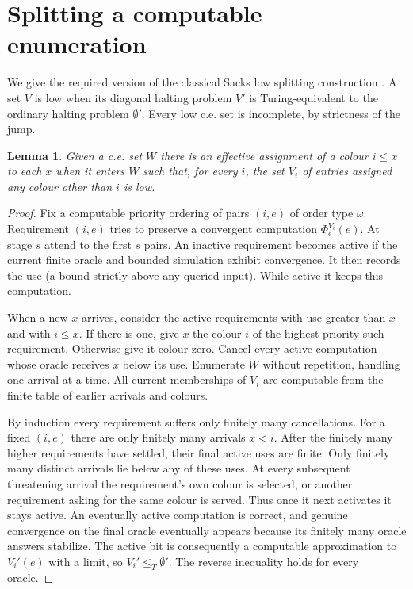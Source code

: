 \documentclass[11pt]{article}
\newtheorem{lemma}[theorem]{Lemma}
\begin{document}
\section{Splitting a computable enumeration}
We give the required version of the classical Sacks low splitting construction \cite{sacks}. A set $V$ is low when its diagonal halting problem $V'$ is Turing-equivalent to the ordinary halting problem $\emptyset'$. Every low c.e. set is incomplete, by strictness of the jump.
\begin{lemma}\label{low}
Given a c.e. set $W$ there is an effective assignment of a colour $i\le x$ to each $x$ when it enters $W$ such that, for every $i$, the set $V_i$ of entries assigned any colour other than $i$ is low.
\end{lemma}
\begin{proof}
Fix a computable priority ordering of pairs $(i,e)$ of order type $\omega$. Requirement $(i,e)$ tries to preserve a convergent computation $\Phi_e^{V_i}(e)$. At stage $s$ attend to the first $s$ pairs. An inactive requirement becomes active if the current finite oracle and bounded simulation exhibit convergence. It then records the use (a bound strictly above any queried input). While active it keeps this computation.

When a new $x$ arrives, consider the active requirements with use greater than $x$ and with $i\le x$. If there is one, give $x$ the colour $i$ of the highest-priority such requirement. Otherwise give it colour zero. Cancel every active computation whose oracle receives $x$ below its use. Enumerate $W$ without repetition, handling one arrival at a time. All current memberships of $V_i$ are computable from the finite table of earlier arrivals and colours.

By induction every requirement suffers only finitely many cancellations. For a fixed $(i,e)$ there are only finitely many arrivals $x<i$. After the finitely many higher requirements have settled, their final active uses are finite. Only finitely many distinct arrivals lie below any of these uses. At every subsequent threatening arrival the requirement's own colour is selected, or another requirement asking for the same colour is served. Thus once it next activates it stays active. An eventually active computation is correct, and genuine convergence on the final oracle eventually appears because its finitely many oracle answers stabilize. The active bit is consequently a computable approximation to $V_i'(e)$ with a limit, so $V_i'\le_T\emptyset'$. The reverse inequality holds for every oracle.
\end{proof}
\end{document}
